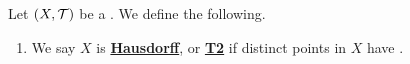 \newcommand{\Hausdorff}[0]{\textbf{\hyperref[def:Hausdorff]{Hausdorff}}\xspace}
\newcommand{\Hausdorffness}[0]{\textbf{\hyperref[def:Hausdorff]{Hausdorffness}}\xspace}
\newcommand{\TTwo}[0]{\textbf{\hyperref[def:Hausdorff]{T2}}\xspace}
\begin{df}
    \label{def:SeparationAxioms}
    Let $(X,\mathcal{T})$ be a \TopologicalSpace. 
    We define the following. 
    \begin{enumerate}[label=(\roman*), ref={\ref{def:SeparationAxioms}~\roman*}]
    \item \label{def:Hausdorff} We say $X$ is \Hausdorff, or \TTwo if 
    distinct points in $X$ have \Disjoint \Neighborhoods.
    \end{enumerate}
\end{df}
